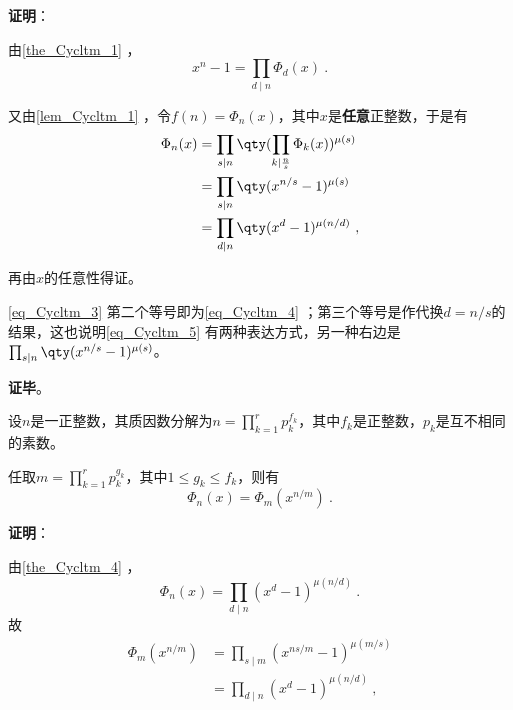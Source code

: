 \textbf{证明}：

由\autoref{the_Cycltm_1} ，
\begin{equation}\label{eq_Cycltm_4}
x^n-1 = \prod_{d\mid n}\Phi_d(x)~.
\end{equation}

又由\autoref{lem_Cycltm_1} ，令$f(n)=\Phi_n(x)$，其中$x$是\textbf{任意}正整数，于是有
\begin{equation}\label{eq_Cycltm_3}
\begin{aligned}
\Phi_n(x)&=\prod_{s\mid n}\qty(\prod_{k\mid \frac{n}{s}}\Phi_k(x))^{\mu(s)}\\
&=\prod_{s\mid n}\qty(x^{n/s}-1)^{\mu(s)}\\
&=\prod_{d\mid n}\qty(x^{d}-1)^{\mu(n/d)}~,
\end{aligned}
\end{equation}

再由$x$的任意性得证。

\autoref{eq_Cycltm_3} 第二个等号即为\autoref{eq_Cycltm_4} ；第三个等号是作代换$d=n/s$的结果，这也说明\autoref{eq_Cycltm_5} 有两种表达方式，另一种右边是$\prod_{s\mid n}\qty(x^{n/s}-1)^{\mu(s)}$。

\textbf{证毕}。











\begin{theorem}{}\label{the_Cycltm_3}
设$n$是一正整数，其质因数分解为$n=\prod_{k=1}^r p_k^{f_k}$，其中$f_k$是正整数，$p_k$是互不相同的素数。

任取$m=\prod_{k=1}^r p_k^{g_k}$，其中$1\leq g_k\leq f_k$，则有
\begin{equation}
\Phi_n(x) = \Phi_m(x^{n/m})~.
\end{equation}
\end{theorem}

\textbf{证明}：

由\autoref{the_Cycltm_4} ，
\begin{equation}
\Phi_n(x) = \prod_{d\mid n}(x^d-1)^{\mu(n/d)}~.
\end{equation}
故
\begin{equation}\label{eq_Cycltm_6}
\begin{aligned}
\Phi_m(x^{n/m}) &= \prod_{s\mid m}(x^{ns/m}-1)^{\mu(m/s)}\\
&=\prod_{d\mid n}(x^{d}-1)^{\mu(n/d)}~,
\end{aligned}
\end{equation}

